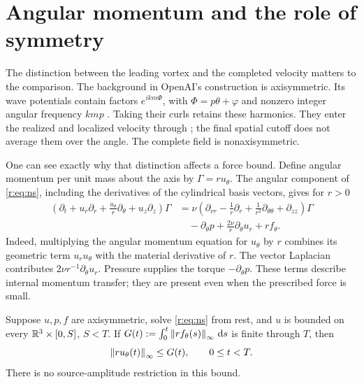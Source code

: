 \section{Angular momentum and the role of symmetry}
\label{r:sec:angular}

The distinction between the leading vortex and the completed velocity
matters to the comparison. The background in OpenAI's construction is
axisymmetric. Its wave potentials contain factors
\(e^{ikm\Phi}\), with \(\Phi=p\theta+\varphi\) and nonzero integer
angular frequency \(kmp\)
\cite[(6.27), (7.3), (7.38)]{openai-paper}. Taking their curls retains
these harmonics. They enter the realized and localized velocity through
\cite[(9.21), (10.4)]{openai-paper}; the final spatial cutoff does not
average them over the angle. The complete field is nonaxisymmetric.

One can see exactly why that distinction affects a force bound. Define
angular momentum per unit mass about the axis by
\(\Gamma=ru_\theta\). The angular component of \eqref{r:eq:ns}, including
the derivatives of the cylindrical basis vectors, gives for \(r>0\)
\begin{equation}
 \begin{aligned}
 \left(\partial_t+u_r\partial_r
       +\frac{u_\theta}{r}\partial_\theta+u_z\partial_z\right)\Gamma
 &=\nu\left(\partial_{rr}-\frac1r\partial_r
       +\frac1{r^2}\partial_{\theta\theta}+\partial_{zz}\right)\Gamma\\
 &\quad-\partial_\theta p
       +\frac{2\nu}{r}\partial_\theta u_r+rf_\theta.
 \end{aligned}
 \label{r:eq:angular-full}
\end{equation}
Indeed, multiplying the angular momentum equation for \(u_\theta\) by
\(r\) combines its geometric term \(u_ru_\theta\) with the material
derivative of \(r\). The vector Laplacian contributes
\(2\nu r^{-1}\partial_\theta u_r\). Pressure supplies the torque
\(-\partial_\theta p\). These terms describe internal momentum transfer;
they are present even when the prescribed force is small.

\begin{proposition}
\label{r:prop:angular-max}
Suppose \(u,p,f\) are axisymmetric, solve \eqref{r:eq:ns} from rest, and
\(u\) is bounded on every \(\mathbb R^3\times[0,S]\), \(S<T\).
If \(G(t):=\int_0^t\left\lVert rf_\theta(s)\right\rVert_\infty\,\mathrm d s\) is finite through
\(T\), then
\begin{equation}
 \left\lVert ru_\theta(t)\right\rVert_\infty\le G(t),\qquad 0\le t<T.
 \label{r:eq:angular-max}
\end{equation}
There is no source-amplitude restriction in this bound.
\end{proposition}

